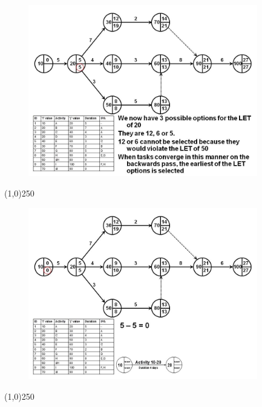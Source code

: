 \begin{frame}
\begin{figure}
	\centering
		\includegraphics[width = 10.0cm]{oldnotes/Slide119.jpg}
\end{figure}
\end{frame}
\begin{center}\line(1,0){250}\end{center}


\begin{frame}
\begin{figure}
	\centering
		\includegraphics[width = 10.0cm]{oldnotes/Slide120.jpg}
\end{figure}
\end{frame}
\begin{center}\line(1,0){250}\end{center}


